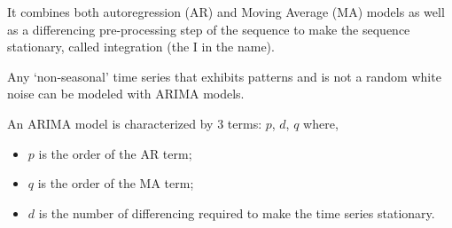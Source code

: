 It combines both autoregression (AR) and Moving Average (MA) models as
well as a differencing pre-processing step of the sequence to make the
sequence stationary, called integration (the I in the name).

Any `non-seasonal' time series that exhibits patterns and is not a
random white noise can be modeled with ARIMA models.

An ARIMA model is characterized by 3 terms: \(p\), \(d\), \(q\) where,

\begin{itemize}
\tightlist
\item
  \(p\) is the order of the AR term;
\item
  \(q\) is the order of the MA term;
\item
  \(d\) is the number of differencing required to make the time series
  stationary.
\end{itemize}

